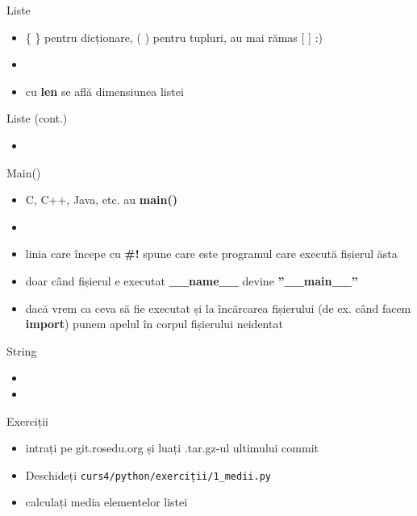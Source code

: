 \documentclass{beamer}
\begin{document}
\begin{frame}{Liste}
  \begin{itemize}
  \item \{ \} pentru dicționare, ( ) pentru tupluri, au mai rămas [ ] :)
  \item \small 
  \item cu \textbf{len} se află dimensiunea listei
  \end{itemize}
\end{frame}

\begin{frame}{Liste (cont.)}
  \begin{itemize}
  \item \small 
  \end{itemize}
\end{frame}


\begin{frame}{Main()}
  \begin{itemize}
  \item C, C++, Java, etc. au \textbf{main()}
  \item \small 
  \item linia care începe cu \textbf{\#!} spune care este programul care execută fișierul ăsta
  \item doar când fișierul e executat \textbf{\_\_name\_\_} devine \textbf{''\_\_main\_\_''}
  \item dacă vrem ca ceva să fie executat și la încărcarea fișierului 
    (de ex. când facem \textbf{import}) punem apelul în corpul fișierului neidentat
  \end{itemize}
\end{frame}


\begin{frame}{String}
  \begin{itemize}
  \item 
  \item 
  \end{itemize}
\end{frame}

\begin{frame}{Exerciții}
  \begin{itemize}
  \item intrați pe git.rosedu.org și luați .tar.gz-ul ultimului commit
  \item Deschideți \texttt{curs4/python/exerciții/1\_medii.py}
  \item calculați media elementelor listei
  \end{itemize}
\end{frame}
\end{document}
